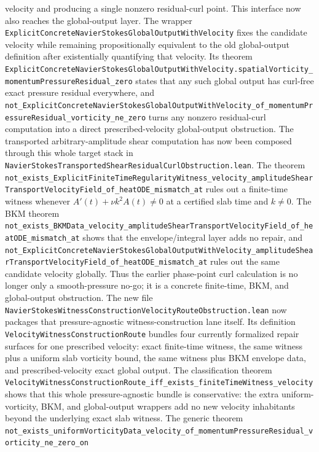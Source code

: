 \documentclass[11pt]{article}
\theoremstyle{remark}
\begin{document}
velocity and producing a single nonzero residual-curl point.
This interface now also reaches the global-output layer.  The wrapper
\texttt{ExplicitConcreteNavierStokesGlobalOutputWithVelocity} fixes the
candidate velocity while remaining propositionally equivalent to the old
global-output definition after existentially quantifying that velocity.  Its
theorem
\texttt{ExplicitConcreteNavierStokesGlobalOutputWithVelocity.spatialVorticity\_momentumPressureResidual\_zero}
states that any such global output has curl-free exact pressure residual
everywhere, and
\texttt{not\_ExplicitConcreteNavierStokesGlobalOutputWithVelocity\_of\_momentumPressureResidual\_vorticity\_ne\_zero}
turns any nonzero residual-curl computation into a direct prescribed-velocity
global-output obstruction.
The transported arbitrary-amplitude shear computation has now been composed
through this whole target stack in
\texttt{NavierStokesTransportedShearResidualCurlObstruction.lean}.  The theorem
\texttt{not\_exists\_ExplicitFiniteTimeRegularityWitness\_velocity\_amplitudeShearTransportVelocityField\_of\_heatODE\_mismatch\_at}
rules out a finite-time witness whenever \(A'(t)+\nu k^2A(t)\neq0\) at a
certified slab time and \(k\neq0\).  The BKM theorem
\texttt{not\_exists\_BKMData\_velocity\_amplitudeShearTransportVelocityField\_of\_heatODE\_mismatch\_at}
shows that the envelope/integral layer adds no repair, and
\texttt{not\_ExplicitConcreteNavierStokesGlobalOutputWithVelocity\_amplitudeShearTransportVelocityField\_of\_heatODE\_mismatch\_at}
rules out the same candidate velocity globally.  Thus the earlier phase-point
curl calculation is no longer only a smooth-pressure no-go; it is a concrete
finite-time, BKM, and global-output obstruction.
The new file
\texttt{NavierStokesWitnessConstructionVelocityRouteObstruction.lean} now
packages that pressure-agnostic witness-construction lane itself.  Its
definition \texttt{VelocityWitnessConstructionRoute} bundles four currently
formalized repair surfaces for one prescribed velocity: exact finite-time
witness, the same witness plus a uniform slab vorticity bound, the same witness
plus BKM envelope data, and prescribed-velocity exact global output.  The
classification theorem
\texttt{VelocityWitnessConstructionRoute\_iff\_exists\_finiteTimeWitness\_velocity}
shows that this whole pressure-agnostic bundle is conservative: the extra
uniform-vorticity, BKM, and global-output wrappers add no new velocity
inhabitants beyond the underlying exact slab witness.  The generic theorem
\texttt{not\_exists\_uniformVorticityData\_velocity\_of\_momentumPressureResidual\_vorticity\_ne\_zero\_on}
\end{document}
